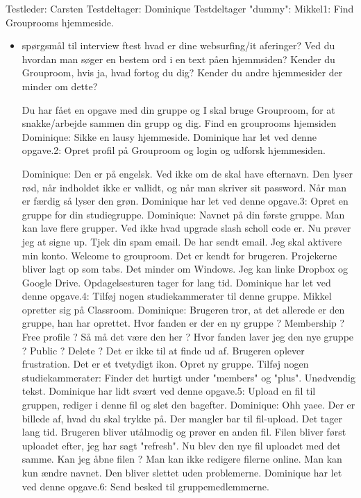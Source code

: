 \documentclass[12pt]{article}
\begin{document}
Testleder: Carsten
Testdeltager: Dominique
Testdeltager "dummy": Mikkel1: Find Grouprooms hjemmeside.

\begin{itemize} 
\item {sp\o rgsm\aa l til interview f\or test}
hvad er dine websurfing/it aferinger?
Ved du hvordan man s\o ger en bestem ord i en text p\aa  en hjemmsiden?
Kender du Grouproom, hvis ja, hvad fortog du dig?
Kender du andre hjemmesider der minder om dette?
 

Du har f\aa et en opgave med din gruppe og I skal bruge Grouproom, for at snakke/arbejde sammen din grupp og dig. Find en grouprooms hjemsiden
Dominique: Sikke en lausy hjemmeside.
Dominique har let ved denne opgave.2: Opret profil på Grouproom og login og udforsk hjemmesiden.

Dominique: Den er på engelsk. Ved ikke om de skal have efternavn. Den lyser rød, når indholdet ikke er vallidt, og når man skriver sit password. Når man er færdig så lyser den grøn.
Dominique har let ved denne opgave.3: Opret en gruppe for din studiegruppe.
Dominique: Navnet på din første gruppe. Man kan lave flere grupper. Ved ikke hvad upgrade slash scholl code er.
Nu prøver jeg at signe up.
Tjek din spam email. De har sendt email.
Jeg skal aktivere min konto.
Welcome to grouproom.
Det er kendt for brugeren. Projekerne bliver lagt op som tabs. Det minder om Windows.
Jeg kan linke Dropbox og Google Drive.
Opdagelsesturen tager for lang tid.
Dominique har let ved denne opgave.4: Tilføj nogen studiekammerater til denne gruppe.
Mikkel opretter sig på Classroom.
Dominique: Brugeren tror, at det allerede er den gruppe, han har oprettet.
Hvor fanden er der en ny gruppe ?
Membership ? Free profile ? Så må det være den her ?
Hvor fanden laver jeg den nye gruppe ? Public ? Delete ?
Det er ikke til at finde ud af. Brugeren oplever frustration.
Det er et tvetydigt ikon. Opret ny gruppe.
Tilføj nogen studiekammerater: Finder det hurtigt under "members" og "plus". Unødvendig tekst.
Dominique har lidt svært ved denne opgave.5: Upload en fil til gruppen, rediger i denne fil og slet den bagefter.
Dominique: Ohh yaee. Der er billede af, hvad du skal trykke på. Der mangler bar til fil-upload. Det tager lang tid. Brugeren bliver utålmodig og prøver en anden fil.
Filen bliver først uploadet efter, jeg har sagt "refresh".
Nu blev den nye fil uploadet med det samme.
Kan jeg åbne filen ? Man kan ikke redigere filerne online. Man kan kun ændre navnet.
Den bliver slettet uden problemerne.
Dominique har let ved denne opgave.6: Send besked til gruppemedlemmerne.

\end{itemize}
\end{document}
